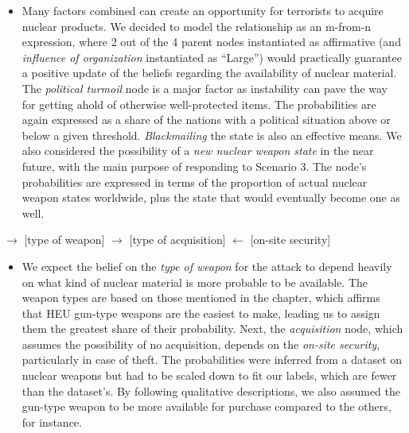 \documentclass{article}
\begin{document}
{\begin{itemize}
    \item      Many factors combined can create an opportunity for terrorists to acquire nuclear products. We decided to model the relationship as an m-from-n expression, where 2 out of the 4 parent nodes instantiated as affirmative (and \textit{influence of organization} instantiated as “Large”) would practically guarantee a positive update of the beliefs regarding the availability of nuclear material. The \textit{political turmoil} node is a major factor\cite{NuclearThreatInitiative} as instability can pave the way for getting ahold of otherwise well-protected items. The probabilities are again expressed as a share of the nations with a political situation above or below a given threshold\cite{NuclearThreatInitiative}. \textit{Blackmailing} the state is also an effective means\cite{ellingsen2009nuclear}. We also considered the possibility of a \textit{new nuclear weapon state} in the near future, with the main purpose of responding to Scenario 3. The node’s probabilities are expressed in terms of the proportion of actual nuclear weapon states worldwide, plus the state that would eventually become one as well.   
\end{itemize}

 $\longrightarrow$ [type of weapon] $\longrightarrow$ [type of acquisition] $\longleftarrow$ [on-site security]  
\begin{itemize}
    \item       We expect the belief on the \textit{type of weapon} for the attack to depend heavily on what kind of nuclear material is more probable to be available. The weapon types are based on those mentioned in the chapter\cite{bostromGlobalCatastrophicRisks2011}, which affirms that HEU gun-type weapons are the easiest to make, leading us to assign them the greatest share of their probability. Next, the \textit{acquisition} node, which assumes the possibility of no acquisition, depends on the \textit{on-site security}, particularly in case of theft. The probabilities were inferred from a dataset\cite{PickYourPOICN} on nuclear weapons but had to be scaled down to fit our labels, which are fewer than the dataset’s. By following qualitative descriptions, we also assumed the gun-type weapon to be more available for purchase compared to the others, for instance.  
\end{itemize}

}
\end{document}
